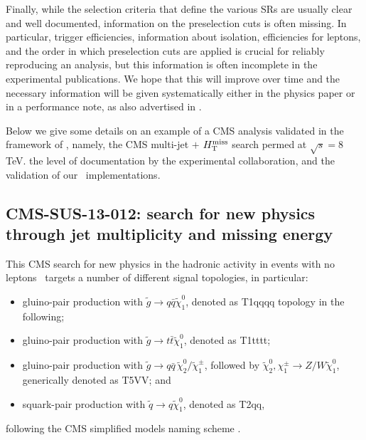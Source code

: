 Finally, while the selection criteria that define the various SRs are usually clear and well documented, 
information on the preselection cuts is often missing. In particular, trigger efficiencies, information about isolation, 
efficiencies for leptons, and the order in which preselection cuts are applied is crucial for reliably reproducing an 
analysis, but this information is often incomplete in the experimental publications. 
We hope that this will improve over time and the necessary information will be given systematically 
either in the physics paper or in a performance note, 
as also advertised in \cite{Kraml:2012sg}.

Below we give some details on an example of a CMS analysis validated in the framework of \ma, namely, the CMS multi-jet $+$ $H_{\text{T}}^{\rm miss}$ search permed at $\sqrt{s}=8$ TeV. the level of documentation by the experimental collaboration, 
and the validation of our \ma\ implementations. 


\subsection{CMS-SUS-13-012: search for new physics through jet multiplicity and missing energy} 
\label{sec:cms-sus-13-012}

This CMS search for new physics in the hadronic activity in events with no leptons~\cite{Chatrchyan:2014lfa} targets a number of different signal topologies, in particular:
\begin{itemize}
\item gluino-pair production with $\tilde g\to q\bar q\tilde\chi^0_1$, denoted as T1qqqq topology in the following;
\item gluino-pair production with $\tilde g\to t\bar t\tilde\chi^0_1$, denoted as T1tttt; 
\item gluino-pair production with $\tilde g\to q\bar q\,\tilde\chi^0_2/\tilde\chi^\pm_1$, followed by 
$\tilde\chi^0_2,\chi^\pm_1 \to Z/W\tilde\chi^0_1$, generically denoted as T5VV; and 
\item squark-pair production with $\tilde q\to q\tilde\chi^0_1$, denoted as T2qq, 
\end{itemize}
following the CMS simplified models naming scheme \cite{Chatrchyan:2013sza}. 



